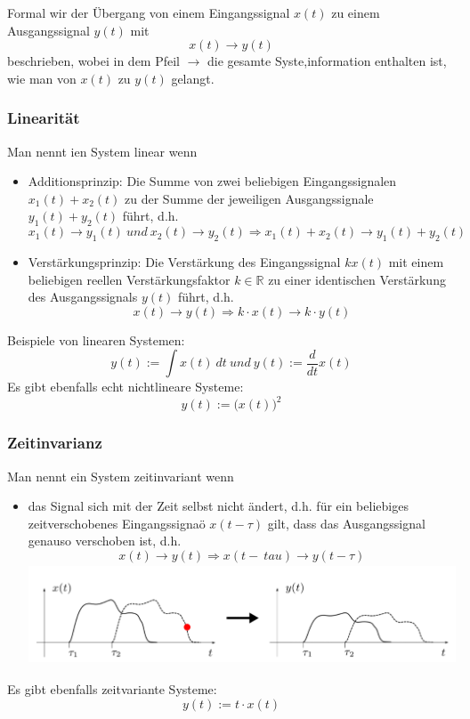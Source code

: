 \documentclass[12pt,a4paper]{scrartcl}
\begin{document}
   \noindent Formal wir der Übergang von einem Eingangssignal $x(t)$ zu einem Ausgangssignal $y(t)$ mit $$ x(t) \to y(t)$$ beschrieben, wobei in dem Pfeil $\to$ die gesamte Syste,information enthalten ist, wie man von $x(t)$ zu $y(t)$ gelangt. \\

   \subsubsection{Linearität}
   \label{sec:sub:sub:linearitaet}
    Man nennt ien System linear wenn
    \begin{itemize}
      \item Additionsprinzip: Die Summe von zwei beliebigen Eingangssignalen $x_1(t) + x_2(t)$ zu der Summe der jeweiligen Ausgangssignale $y_1(t) + y_2(t)$ führt, d.h. 
            $$x_1(t) \to y_1(t)\ und\ x_2(t)\to y_2(t) \Rightarrow x_1(t) + x_2(t) \to y_1(t) + y_2(t)$$ 
      \item Verstärkungsprinzip: Die Verstärkung des Eingangssignal $kx(t)$ mit einem beliebigen reellen Verstärkungsfaktor $ k \in \mathbb{R}$ zu einer identischen Verstärkung des Ausgangssignals $y(t)$ führt, d.h.
          $$ x(t) \to y(t) \Rightarrow k\cdot x(t) \to k\cdot y(t)$$ 
    \end{itemize}
\noindent Beispiele von linearen Systemen: $$ y(t) := \int x(t)\ dt \ und \ y(t) := \frac{d}{dt}x(t)$$
\noindent Es gibt ebenfalls echt nichtlineare Systeme: $$y(t) := \big(x(t)\big)^2$$


    \subsubsection{Zeitinvarianz}
    \label{sec:sub:sub:zeitinvarianz}
    Man nennt ein System zeitinvariant wenn 
    \begin{itemize}
      \item das Signal sich mit der Zeit selbst nicht ändert, d.h. für ein beliebiges zeitverschobenes Eingangssignaö $x(t-\tau)$ gilt, dass das Ausgangssignal genauso verschoben ist, d.h. 
        $$ x(t) \to y(t) \Rightarrow x(t-\ tau) \to y(t - \tau)$$
        \includegraphics[height=3cm]{Pictures/Zeitinvarianz.png}
    \end{itemize}
    \noindent Es gibt ebenfalls zeitvariante Systeme: $$y(t) := t\cdot x(t)$$
\end{document}
